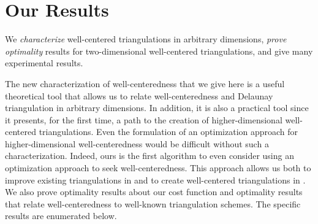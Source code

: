\documentclass[final]{siamltex}
\begin{document}
\section{Our Results} We \emph{characterize} well-centered
triangulations in arbitrary dimensions,
\emph{prove optimality} results for two-dimensional
well-centered triangulations, and give many experimental results.

The new characterization of well-centeredness that we give here is a
useful theoretical tool that allows us to relate well-centeredness and
Delaunay triangulation in arbitrary dimensions. In addition, it is
also a practical tool since it presents, for the first time, a path to
the creation of higher-dimensional well-centered triangulations.  Even
the formulation of an optimization approach for higher-dimensional
well-centeredness would be difficult without such a characterization.
Indeed, ours is the first algorithm
to even consider using an optimization approach
to seek well-centeredness. This approach allows us
both to improve existing triangulations in 
and to create well-centered triangulations in .
We also prove optimality results about our cost function
and optimality results that relate well-cen\-tered\-ness to well-known
triangulation schemes. The specific results are enumerated below.
\end{document}
